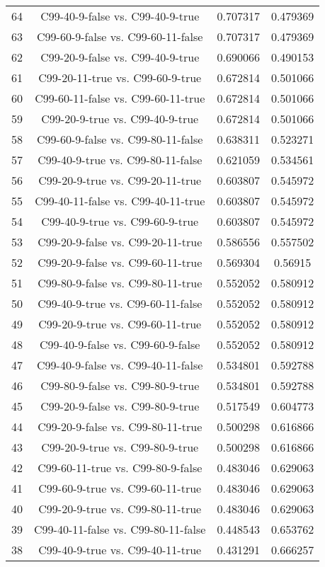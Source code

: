 \documentclass[a4paper,10pt]{article}
\begin{document}
\begin{landscape}
\begin{table}[!htp]
\begin{tabular}{cccc}
64&C99-40-9-false vs. C99-40-9-true&0.707317&0.479369\\
63&C99-60-9-false vs. C99-60-11-false&0.707317&0.479369\\
62&C99-20-9-false vs. C99-40-9-true&0.690066&0.490153\\
61&C99-20-11-true vs. C99-60-9-true&0.672814&0.501066\\
60&C99-60-11-false vs. C99-60-11-true&0.672814&0.501066\\
59&C99-20-9-true vs. C99-40-9-true&0.672814&0.501066\\
58&C99-60-9-false vs. C99-80-11-false&0.638311&0.523271\\
57&C99-40-9-true vs. C99-80-11-false&0.621059&0.534561\\
56&C99-20-9-true vs. C99-20-11-true&0.603807&0.545972\\
55&C99-40-11-false vs. C99-40-11-true&0.603807&0.545972\\
54&C99-40-9-true vs. C99-60-9-true&0.603807&0.545972\\
53&C99-20-9-false vs. C99-20-11-true&0.586556&0.557502\\
52&C99-20-9-false vs. C99-60-11-true&0.569304&0.56915\\
51&C99-80-9-false vs. C99-80-11-true&0.552052&0.580912\\
50&C99-40-9-true vs. C99-60-11-false&0.552052&0.580912\\
49&C99-20-9-true vs. C99-60-11-true&0.552052&0.580912\\
48&C99-40-9-false vs. C99-60-9-false&0.552052&0.580912\\
47&C99-40-9-false vs. C99-40-11-false&0.534801&0.592788\\
46&C99-80-9-false vs. C99-80-9-true&0.534801&0.592788\\
45&C99-20-9-false vs. C99-80-9-true&0.517549&0.604773\\
44&C99-20-9-false vs. C99-80-11-true&0.500298&0.616866\\
43&C99-20-9-true vs. C99-80-9-true&0.500298&0.616866\\
42&C99-60-11-true vs. C99-80-9-false&0.483046&0.629063\\
41&C99-60-9-true vs. C99-60-11-true&0.483046&0.629063\\
40&C99-20-9-true vs. C99-80-11-true&0.483046&0.629063\\
39&C99-40-11-false vs. C99-80-11-false&0.448543&0.653762\\
38&C99-40-9-true vs. C99-40-11-true&0.431291&0.666257\\

\end{tabular}
\end{table}
\end{landscape}
\end{document}
